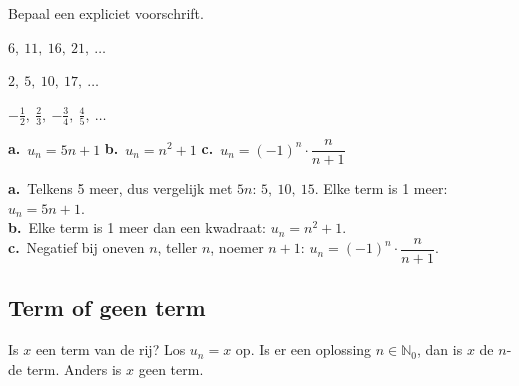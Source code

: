 

\begin{oefeningen}
\begin{oefening}
Bepaal een expliciet voorschrift.
\begin{reeks}
  \item $6,\ 11,\ 16,\ 21,\ \ldots$
  \item $2,\ 5,\ 10,\ 17,\ \ldots$
  \item $-\tfrac12,\ \tfrac23,\ {-\tfrac34},\ \tfrac45,\ \ldots$
\end{reeks}
\begin{solution}
\textbf{a.}~$u_n=5n+1$ \quad \textbf{b.}~$u_n=n^2+1$ \quad \textbf{c.}~$u_n=(-1)^n\cdot\dfrac{n}{n+1}$
\end{solution}
\begin{fullsolution}
\textbf{a.}~Telkens 5 meer, dus vergelijk met $5n$: $5,\ 10,\ 15$. Elke term is 1 meer: $u_n=5n+1$.\\
\textbf{b.}~Elke term is 1 meer dan een kwadraat: $u_n=n^2+1$.\\
\textbf{c.}~Negatief bij oneven $n$, teller $n$, noemer $n+1$: $u_n=(-1)^n\cdot\dfrac{n}{n+1}$.
\end{fullsolution}
\end{oefening}
\end{oefeningen}

\subsection{Term of geen term}

\begin{werkwijze}
Is $x$ een term van de rij? Los $u_n = x$ op. Is er een oplossing $n \in \mathbb{N}_0$, dan is $x$ de $n$-de term. Anders is $x$ geen term.
\end{werkwijze}


